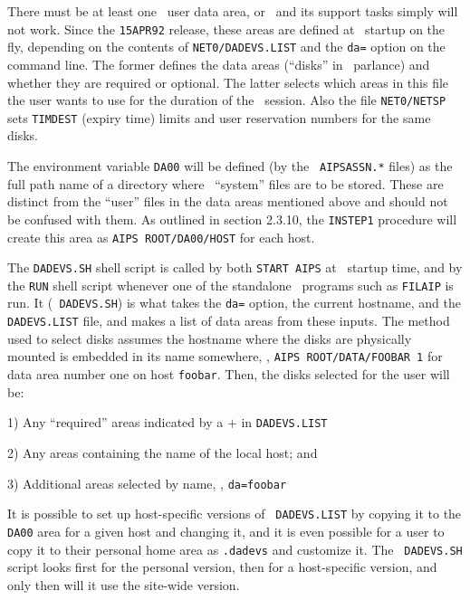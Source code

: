 \medskip{}

There must be at least one \AIPS\ user data area, or \AIPS\ and its
support tasks simply will not work.  Since the {\tt 15APR92} release,
these areas are defined at \AIPS\ startup on the fly, depending on the
contents of {\tt \dol NET0/DADEVS.LIST} and the {\tt da=} option on the
command line.  The former defines the data areas (``disks'' in \AIPS\
parlance) and whether they are required or optional.  The latter selects
which areas in this file the user wants to use for the duration of the
\AIPS\ session.  Also the file {\tt\dol NET0/NETSP} sets {\tt TIMDEST}
(expiry time) limits and user reservation numbers for the same disks.

The environment variable {\tt DA00} will be defined (by the {\tt
AIPSASSN.*} files) as the full path name of a directory where
\AIPS\ ``system'' files are to be stored.  These are distinct from the
``user'' files in the data areas mentioned above and should not be
confused with them.  As outlined in section 2.3.10,
the {\tt INSTEP1} procedure will create this area as
{\tt\dol AIPS ROOT/DA00/\dol HOST} for each host.

The {\tt DADEVS.SH} shell script is called by both {\tt START AIPS} at
\AIPS\ startup time, and by the {\tt RUN} shell script whenever one of
the standalone \AIPS\ programs such as {\tt FILAIP} is run.  It ({\tt
DADEVS.SH}) is what takes the {\tt da=} option, the current hostname,
and the {\tt DADEVS.LIST} file, and makes a list of data areas from
these inputs.  The method used to select disks assumes the hostname
where the disks are physically mounted is embedded in its name
somewhere, \eg, {\tt \dol AIPS ROOT/DATA/FOOBAR\char95 1} for data area number
one on host {\tt foobar}.  Then, the disks selected for the user will
be:\medskip

\item{1)} Any ``required'' areas indicated by a $+$ in {\tt DADEVS.LIST}
\item{2)} Any areas containing the name of the local host; and
\item{3)} Additional areas selected by name, \eg, {\tt da=foobar}
\medskip

\noindent It is possible to set up host-specific versions of {\tt
DADEVS.LIST} by copying it to the {\tt\dol DA00} area for a given host and
changing it, and it is even possible for a user to copy it to their
personal home area as {\tt .dadevs} and customize it.  The {\tt
DADEVS.SH} script looks first for the personal version, then for a
host-specific version, and only then will it use the site-wide version.

